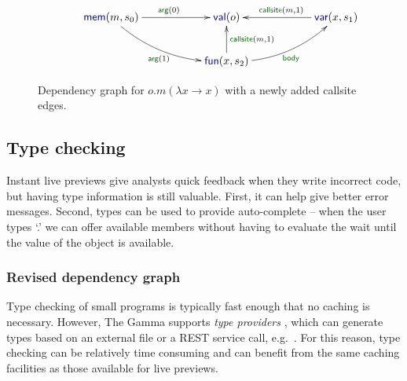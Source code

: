 \documentclass[english,submission]{programming}
\theoremstyle{plain}
\theoremstyle{definition}
\newcommand{\bnd}[1]{\textnormal{\textcolor{kvdclr}{\sffamily #1}}}
\newcommand{\blbl}[1]{\textnormal{\textcolor{numclr}{\sffamily #1}}}
\begin{document}

\begin{figure}
\vspace{-0.5em}
\begin{equation*}
\hspace{3em}
\xymatrix{
\bnd{mem}(m, s_0) \ar@/_1pc/[drr]_{\blbl{arg}(1)} \ar[rr]^{\blbl{arg}(0)} && \bnd{val}(o) && \bnd{var}(x, s_1)\ar[ll]_{\blbl{callsite}(m, 1)} \\
&&\bnd{fun}(x, s_2) \ar[u]_{\blbl{callsite}(m, 1)} \ar@/_1pc/[rru]_{\blbl{body}} &&
}
\end{equation*}
\vspace{-0.5em}
\caption{Dependency graph for $o.m(\lambda x\rightarrow x)$ with a newly added \blbl{callsite} edges.}
\label{fig:graph-func}
\vspace{-0.5em}
\end{figure}


\subsection{Type checking}
\label{sec:extra-types}

Instant live previews give analysts quick feedback when they write incorrect code, but
having type information is still valuable. First, it can help give better error messages. Second,
types can be used to provide auto-complete -- when the user types `.' we can offer available
members without having to evaluate the wait until the value of the object is available.

\subsubsection{Revised dependency graph}
Type checking of small programs is typically fast enough that no caching is necessary. However,
The Gamma supports \emph{type providers} \cite{providers-fsharp,providers-idris}, which can
generate types based on an external file or a REST service call, e.g.~\cite{fsdata}. For this
reason, type checking can be relatively time consuming and can benefit from the same caching
facilities as those available for live previews.
\end{document}
